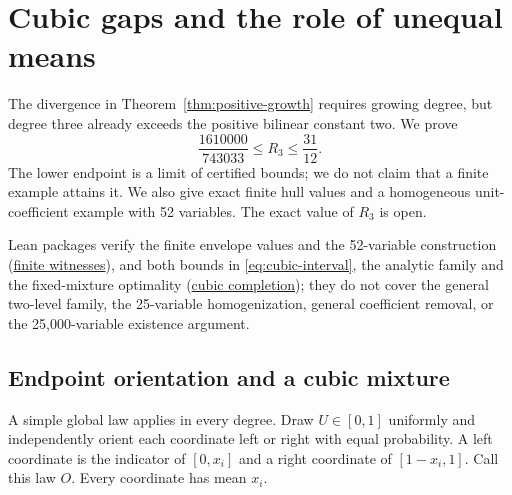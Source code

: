 \section{Cubic gaps and the role of unequal means}\label{sec:cubic}
The divergence in Theorem~\ref{thm:positive-growth} requires growing
degree, but degree three already exceeds the positive bilinear constant
two. We prove
\begin{equation}\label{eq:cubic-interval}
 \frac{1610000}{743033}\le R_3\le\frac{31}{12}.
\end{equation}
The lower endpoint is a limit of certified bounds; we do not claim that a
finite example attains it. We also give exact finite hull values and a homogeneous
unit-coefficient example with 52 variables. The exact value of $R_3$ is
open.

Lean packages verify the finite envelope values and the 52-variable
construction (\href{../formal/topics/04-cubic-gaps/COVERAGE.md}{finite witnesses}),
and both bounds in \eqref{eq:cubic-interval}, the analytic family and the
fixed-mixture optimality
(\href{../formal/topics/11-cubic-completion/COVERAGE.md}{cubic completion});
they do not cover the general two-level family, the 25-variable
homogenization, general coefficient removal, or the 25,000-variable
existence argument.

\subsection{Endpoint orientation and a cubic mixture}
A simple global law applies in every degree. Draw
$U\in[0,1]$ uniformly and independently orient each coordinate left or
right with equal probability. A left coordinate is the indicator of
$[0,x_i]$ and a right coordinate of $[1-x_i,1]$. Call this law $O$.
Every coordinate has mean $x_i$.

